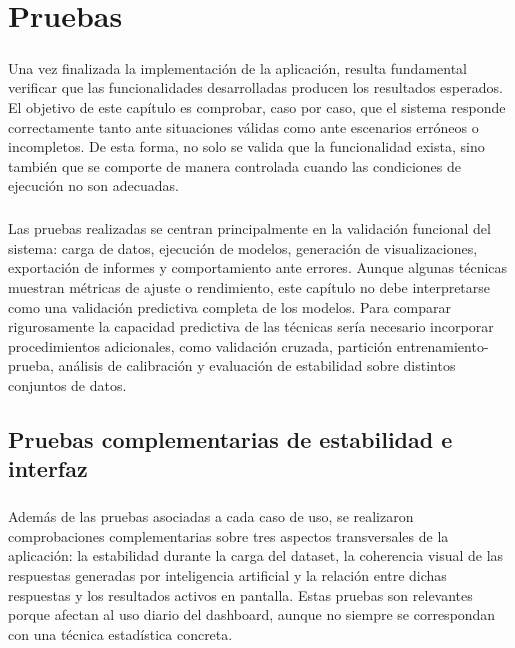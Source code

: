 \chapter{Pruebas}

\paragraph*{}
Una vez finalizada la implementación de la aplicación, resulta fundamental verificar que las funcionalidades desarrolladas producen los resultados esperados. El objetivo de este capítulo es comprobar, caso por caso, que el sistema responde correctamente tanto ante situaciones válidas como ante escenarios erróneos o incompletos. De esta forma, no solo se valida que la funcionalidad exista, sino también que se comporte de manera controlada cuando las condiciones de ejecución no son adecuadas.

\paragraph*{}Las pruebas realizadas se centran principalmente en la validación funcional del sistema: carga de datos, ejecución de modelos, generación de visualizaciones, exportación de informes y comportamiento ante errores. Aunque algunas técnicas muestran métricas de ajuste o rendimiento, este capítulo no debe interpretarse como una validación predictiva completa de los modelos. Para comparar rigurosamente la capacidad predictiva de las técnicas sería necesario incorporar procedimientos adicionales, como validación cruzada, partición entrenamiento-prueba, análisis de calibración y evaluación de estabilidad sobre distintos conjuntos de datos.

\newcommand{\tituloPrueba}[1]{\Needspace{0.65\textheight}\vspace{0.8em}\noindent\textbf{\underline{#1}}\par\vspace{0.4em}}

\section{Pruebas complementarias de estabilidad e interfaz}

\paragraph*{}
Además de las pruebas asociadas a cada caso de uso, se realizaron comprobaciones complementarias sobre tres aspectos transversales de la aplicación: la estabilidad durante la carga del dataset, la coherencia visual de las respuestas generadas por inteligencia artificial y la relación entre dichas respuestas y los resultados activos en pantalla. Estas pruebas son relevantes porque afectan al uso diario del dashboard, aunque no siempre se correspondan con una técnica estadística concreta.

